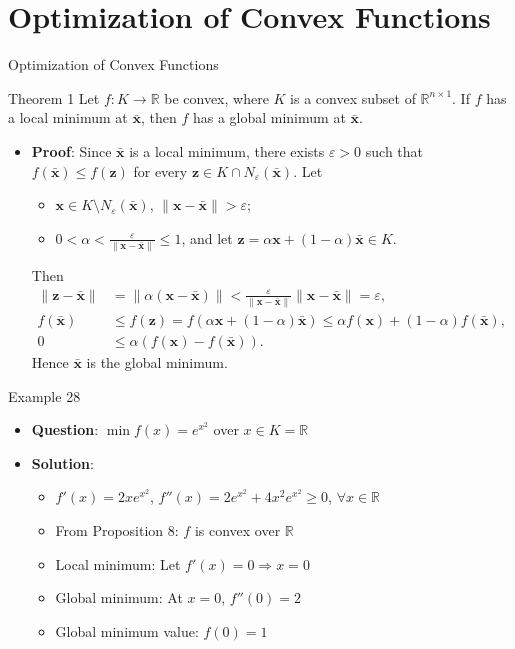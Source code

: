 \documentclass[aspectratio=169,hyperref,UTF8,CJK]{beamer}
\newcommand{\R}{\mathbb{R}}
\newcommand{\vect}[1]{\boldsymbol{#1}}
\begin{document}
\section{Optimization of Convex Functions}

\begin{frame}{Optimization of Convex Functions}
  \scriptsize
  \begin{block}{Theorem 1}
    Let $f:K\to\R$ be convex, where $K$ is a convex subset of $\R^{n\times1}$. If $f$ has a local minimum at $\bar{\vect{x}}$, then $f$ has a global minimum at $\bar{\vect{x}}$.
  \end{block}
  \begin{itemize}
    \item \textbf{Proof}: Since $\bar{\vect{x}}$ is a local minimum, there exists $\varepsilon>0$ such that $f(\bar{\vect{x}})\le f(\vect{z})$ for every $\vect{z}\in K\cap N_{\varepsilon}(\bar{\vect{x}})$. Let
      \begin{itemize}
        \item $\vect{x}\in K\setminus N_{\varepsilon}(\bar{\vect{x}})$, $\|\vect{x}-\bar{\vect{x}}\|>\varepsilon$;
        \item $0<\alpha<\frac{\varepsilon}{\|\vect{x}-\bar{\vect{x}}\|}\le1$, and let $\vect{z}=\alpha\vect{x}+(1-\alpha)\bar{\vect{x}}\in K$.
      \end{itemize}
      Then
      \begin{align*}
        \|\vect{z}-\bar{\vect{x}}\|&=\|\alpha(\vect{x}-\bar{\vect{x}})\|
        <\frac{\varepsilon}{\|\vect{x}-\bar{\vect{x}}\|}\|\vect{x}-\bar{\vect{x}}\|=\varepsilon,\\
        f(\bar{\vect{x}})&\le f(\vect{z})
        =f(\alpha\vect{x}+(1-\alpha)\bar{\vect{x}})
        \le\alpha f(\vect{x})+(1-\alpha)f(\bar{\vect{x}}),\\
        0&\le\alpha(f(\vect{x})-f(\bar{\vect{x}})).
      \end{align*}
      Hence $\bar{\vect{x}}$ is the global minimum.
  \end{itemize}
\end{frame}

\begin{frame}{Example 28}
  \small
  \begin{itemize}
    \item \textbf{Question}: $\min f(x)=e^{x^2}$ over $x\in K=\R$
    \item \textbf{Solution}:
      \begin{itemize}
        \item $f'(x)=2xe^{x^2}$, $f''(x)=2e^{x^2}+4x^2e^{x^2}\ge0$, $\forall x\in\R$
        \item From Proposition 8: $f$ is convex over $\R$
        \item Local minimum: Let $f'(x)=0\Longrightarrow x=0$
        \item Global minimum: At $x=0$, $f''(0)=2$
        \item Global minimum value: $f(0)=1$
      \end{itemize}
  \end{itemize}
\end{frame}
\end{document}
